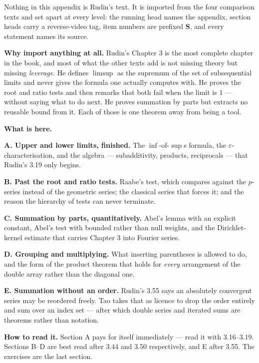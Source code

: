
\begin{roadmap}
Nothing in this appendix is Rudin's text. It is imported from the four
comparison texts and set apart at every level: the running head names the
appendix, section heads carry a reverse-video tag, item numbers are prefixed
\textbf{S}, and every statement names its source.

\medskip
\raggedright
\textbf{Why import anything at all.} Rudin's Chapter 3 is the most complete
chapter in the book, and most of what the other texts add is not missing
theory but missing \emph{leverage}. He defines $\limsup$ as the supremum of
the set of subsequential limits and never gives the formula one actually
computes with. He proves the root and ratio tests and then remarks that both
fail when the limit is $1$ --- without saying what to do next. He proves
summation by parts but extracts no reusable bound from it. Each of those is
one theorem away from being a tool.

\medskip
\textbf{What is here.}

\smallskip
\textbf{A. Upper and lower limits, finished.} The $\inf$-of-$\sup$s formula,
the $\varepsilon$-characterisation, and the algebra --- subadditivity,
products, reciprocals --- that Rudin's 3.19 only begins.

\medskip
\textbf{B. Past the root and ratio tests.} Raabe's test, which compares
against the $p$-series instead of the geometric series; the classical series
that forces it; and the reason the hierarchy of tests can never terminate.

\medskip
\textbf{C. Summation by parts, quantitatively.} Abel's lemma with an explicit
constant, Abel's test with bounded rather than null weights, and the
Dirichlet-kernel estimate that carries Chapter 3 into Fourier series.

\medskip
\textbf{D. Grouping and multiplying.} What inserting parentheses is allowed
to do, and the form of the product theorem that holds for \emph{every}
arrangement of the double array rather than the diagonal one.

\medskip
\textbf{E. Summation without an order.} Rudin's 3.55 says an absolutely
convergent series may be reordered freely. Tao takes that as licence to drop
the order entirely and sum over an index set --- after which double series
and iterated sums are theorems rather than notation.

\medskip
\textbf{How to read it.} Section A pays for itself immediately --- read it
with 3.16--3.19. Sections B--D are best read after 3.44 and 3.50
respectively, and E after 3.55. The exercises are the last section.
\end{roadmap}

